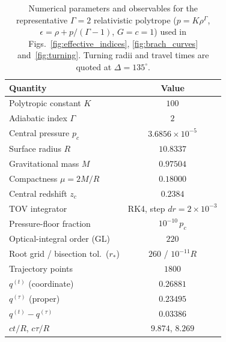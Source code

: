 \documentclass[
  aps,
  prd,
  twocolumn,
  nofootinbib,
  superscriptaddress,
  longbibliography
]{revtex4-2}
\begin{document}
\begin{table}[tb]
\centering
\caption{Numerical parameters and observables for the representative
$\Gamma=2$ relativistic polytrope ($p=K\rho^\Gamma$,
$\epsilon=\rho+p/(\Gamma-1)$, $G=c=1$) used in
Figs.~\ref{fig:effective_indices}, \ref{fig:brach_curves}
and~\ref{fig:turning}. Turning radii and travel times are quoted at
$\Delta=135^\circ$.}
\label{tab:params}
\begin{tabular}{lc}
\hline\hline
Quantity & Value \\
\hline
Polytropic constant $K$              & $100$ \\
Adiabatic index $\Gamma$             & $2$ \\
Central pressure $p_c$               & $3.6856\times10^{-5}$ \\
Surface radius $R$                   & $10.8337$ \\
Gravitational mass $M$               & $0.97504$ \\
Compactness $\mu=2M/R$               & $0.18000$ \\
Central redshift $z_c$               & $0.2384$ \\
TOV integrator                       & RK4, step $dr=2\times10^{-3}$ \\
Pressure-floor fraction              & $10^{-10}\,p_c$ \\
Optical-integral order (GL)          & $220$ \\
Root grid / bisection tol.\ ($r_*$)  & $260$ / $10^{-11}R$ \\
Trajectory points                    & $1800$ \\
$q^{(t)}$ (coordinate)               & $0.26881$ \\
$q^{(\tau)}$ (proper)                & $0.23495$ \\
$q^{(t)}-q^{(\tau)}$                 & $0.03386$ \\
$ct/R$, $c\tau/R$                    & $9.874$, $8.269$ \\
\hline\hline
\end{tabular}
\end{table}
\end{document}
